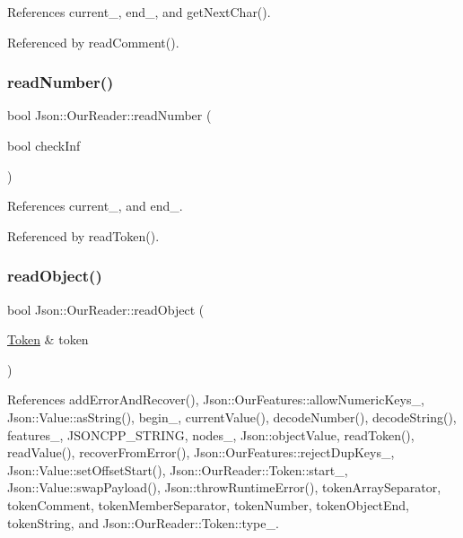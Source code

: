 References current\+\_\+, end\+\_\+, and get\+Next\+Char().



Referenced by read\+Comment().

\mbox{\label{classJson_1_1OurReader_aefcb9a78cc45870ccac2db2a66c8ec50_aefcb9a78cc45870ccac2db2a66c8ec50}} 
\subsubsection{\texorpdfstring{read\+Number()}{readNumber()}}
{\footnotesize\ttfamily bool Json\+::\+Our\+Reader\+::read\+Number (\begin{DoxyParamCaption}\item[{bool}]{check\+Inf }\end{DoxyParamCaption})\hspace{0.3cm}{\ttfamily [private]}}



References current\+\_\+, and end\+\_\+.



Referenced by read\+Token().

\mbox{\label{classJson_1_1OurReader_aea198f8101dba55099f4d8121a993530_aea198f8101dba55099f4d8121a993530}} 
\subsubsection{\texorpdfstring{read\+Object()}{readObject()}}
{\footnotesize\ttfamily bool Json\+::\+Our\+Reader\+::read\+Object (\begin{DoxyParamCaption}\item[{\hyperlink{classJson_1_1OurReader_1_1Token}{Token} \&}]{token }\end{DoxyParamCaption})\hspace{0.3cm}{\ttfamily [private]}}



References add\+Error\+And\+Recover(), Json\+::\+Our\+Features\+::allow\+Numeric\+Keys\+\_\+, Json\+::\+Value\+::as\+String(), begin\+\_\+, current\+Value(), decode\+Number(), decode\+String(), features\+\_\+, J\+S\+O\+N\+C\+P\+P\+\_\+\+S\+T\+R\+I\+NG, nodes\+\_\+, Json\+::object\+Value, read\+Token(), read\+Value(), recover\+From\+Error(), Json\+::\+Our\+Features\+::reject\+Dup\+Keys\+\_\+, Json\+::\+Value\+::set\+Offset\+Start(), Json\+::\+Our\+Reader\+::\+Token\+::start\+\_\+, Json\+::\+Value\+::swap\+Payload(), Json\+::throw\+Runtime\+Error(), token\+Array\+Separator, token\+Comment, token\+Member\+Separator, token\+Number, token\+Object\+End, token\+String, and Json\+::\+Our\+Reader\+::\+Token\+::type\+\_\+.



